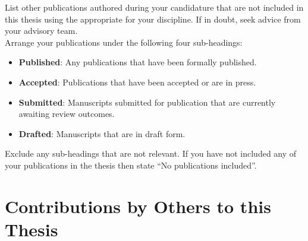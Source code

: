 \begin{instructional}
    List other publications authored during your candidature that are not included in this thesis using the appropriate \href{https://guides.library.uq.edu.au/referencing}{\color{blue}{referencing style}} for your discipline. If in doubt, seek advice from your advisory team.\\


    \noindent
    Arrange your publications under the following four sub-headings:
    \begin{itemize}
        \item \textbf{Published}: Any publications that have been formally published.
        \item \textbf{Accepted}: Publications that have been accepted or are in press.
        \item \textbf{Submitted}: Manuscripts submitted for publication that are currently awaiting review outcomes.
        \item \textbf{Drafted}: Manuscripts that are in draft form.
    \end{itemize}
    
    \noindent
	Exclude any sub-headings that are not relevant. If you have not included any of your publications in the thesis then state ``No publications included''.\\


\end{instructional}





\clearpage
\section*{Contributions by Others to this Thesis}

